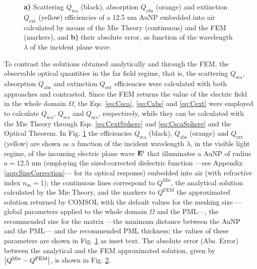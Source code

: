 \begin{figure}[b!]
 \def\svgwidth{.9\textwidth}
 \small
 \centering
    \hspace*{-.95\textwidth}
     \begin{subfigure}{\textwidth}\caption{}\label{fig:Eff:First:a}\end{subfigure}\\[11.5em]
    \hspace*{-.95\textwidth}
     \begin{subfigure}{\textwidth}\caption{}\label{fig:Eff:First:b}\end{subfigure}\\[-15em]
\caption[Scattering, Absorption and Extinction Efficiencies of a 12.5 nm AuNP$@$Air: Analytical and FEM solutions with no optimization]{\textbf{a)} Scattering $Q_\text{sca}$ (black), absorption $Q_\text{abs}$ (orange) and extinction $Q_\text{ext}$ (yellow) efficiencies of a 12.5 nm AuNP embedded into air calculated by means of the Mie Theory (continuous) and the FEM (markers), and \textbf{b)} their absolute error, as function of the wavelength $\lambda$ of the incident plane wave.}
\label{fig:Eff:First}
\end{figure}
%

To contrast the solutions obtained analytically and through the FEM, the observable optical quantities in the far field regime, that is, the scattering $Q_\text{sca}$, absorption $Q_\text{abs}$ and extinction $Q_\text{ext}$ efficiencies were calculated with both approaches and contrasted. Since the FEM returns the value of the electric field in the whole domain $\Omega$, the Eqs. \eqref{eq:Csca}, \eqref{eq:Cabs} and \eqref{eq:Cext} were employed to calculate $Q_\text{sca}$, $Q_\text{sca}$ and $Q_\text{sca}$, respectively, while they can be calculated with the Mie Theory through Eqs. \eqref{eq:CextSphere} and \eqref{eq:CscaSphere} and the Optical Theorem. In Fig. \ref{fig:Eff:First:a} the efficiencies  $Q_\text{sca}$ (black),  $Q_\text{abs}$ (orange) and $Q_\text{ext}$ (yellow) are shown as a function of the incident wavelength $\lambda$, in the visible light regime,  of the incoming electric plane wave $\vb{E}^\text{i}$ that illuminates a AuNP of radius $a = 12.5$ nm (employing the sized-corrected dielectric function ---see Appendix \ref{app:SizeCorrection}--- for its optical response) embedded into air (with refractive index $n_\text{m} = 1$); the continuous lines correspond to $Q^\text{Mie}$, the analytical solution calculated by the Mie Theory, and the markers to $Q^\text{FEM}$ the approximated solution returned by COMSOL with the default values for the meshing size ---global parameters applied to the whole domain $\Omega$ and the PML---, the recommended size for the matrix ---the minimum distance between the AuNP and the PML--- and the recommended PML thickness; the values of these parameters are shown in Fig. \ref{fig:Eff:First:a} as inset text. The absolute error (Abs. Error) between the analytical and the FEM  approximated solution, given by $\abs{Q^\text{Mie}-Q^\text{FEM}}$, is shown in Fig. \ref{fig:Eff:First:b}.

